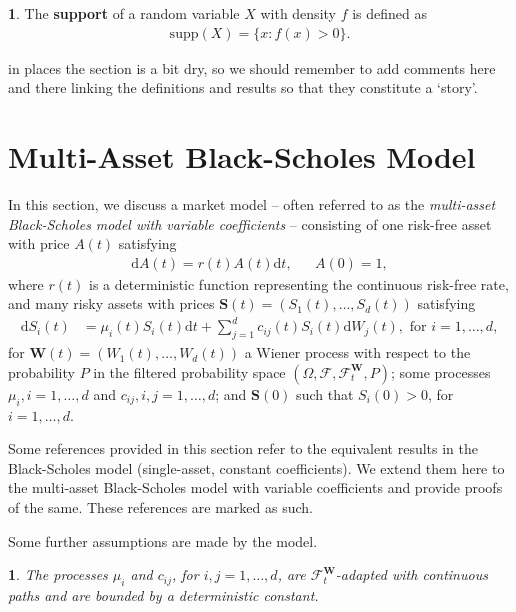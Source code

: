 \documentclass[english]{article}
\newcommand{\comment}[1]{\color{blue}#1\color{black}}
\numberwithin{equation}{section}
\numberwithin{figure}{section}
\theoremstyle{bolddescit}
\theoremstyle{definition}
\newtheorem{definition}[theorem]{\protect\definitionname}
\theoremstyle{definition}
\theoremstyle{plain}
\theoremstyle{plain}
\theoremstyle{bolddesc}
\newtheorem{assumption}[theorem]{\protect\assumptionname}
\theoremstyle{plain}
\theoremstyle{remark}
\providecommand{\assumptionname}{Assumption}
\providecommand{\definitionname}{Definition}
\begin{document}
\begin{definition}
  The \textbf{support} of a random variable $X$ with density $f$ is defined as
  \begin{align*}
    \mathrm{supp}(X) = \{x : f(x) > 0\}.
  \end{align*}
\end{definition}
\comment{in places the section is a bit dry, so we should remember to add comments here and there linking the definitions and results so that they constitute a `story'.}
\section{Multi-Asset Black-Scholes Model}

In this section, we discuss a market model -- often referred to as the \textit{multi-asset Black-Scholes model with variable coefficients} -- consisting of one risk-free asset with price $A(t)$ satisfying
\begin{align}\label{eq:multi-bs-eq-risk-free}
  \mathrm{d}A(t) = r(t) A(t) \mathrm{d}t, && A(0) = 1,
\end{align}
where $r(t)$ is a deterministic function representing the continuous risk-free rate, and many risky assets with prices $\mathbf{S}(t) = (S_1(t), \ldots, S_d(t))$ satisfying
\begin{align}
  \mathrm{d}S_i(t) &= \mu_i(t) S_i(t) \mathrm{d}t + \sum_{j=1}^{d} c_{ij}(t) S_i(t) \mathrm{d}W_j(t), \text{ for } i = 1,\ldots,d,\label{eq:multi-bs-eq}
\end{align}
for $\mathbf{W}(t) = (W_1(t), \ldots, W_d(t))$ a Wiener process with respect to the probability $P$ in the filtered probability space $(\Omega, \mathcal{F}, \mathcal{F}^\mathbf{W}_t, P)$; some processes $\mu_i, i=1,\ldots,d$ and $c_{ij}, i,j=1,\ldots,d$; and $\mathbf{S}(0)$ such that $S_i(0) > 0$, for $i=1,\ldots,d$.

Some references provided in this section refer to the equivalent results in the Black-Scholes model (single-asset, constant coefficients). We extend them here to the multi-asset Black-Scholes model with variable coefficients and provide proofs of the same. These references are marked as such.

Some further assumptions are made by the model.

\begin{assumption}\label{ass:drift-vol-regularity}
  The processes $\mu_i$ and $c_{ij}$, for $i,j=1,\ldots,d$, are $\mathcal{F}^\mathbf{W}_t$-adapted with continuous paths and are bounded by a deterministic constant.
\end{assumption}
\end{document}
